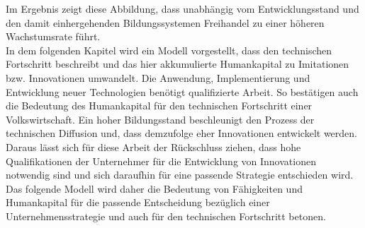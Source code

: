 Im Ergebnis zeigt diese Abbildung, dass unabhängig vom Entwicklungsstand und den damit einhergehenden Bildungssystemen Freihandel zu einer höheren Wachstumsrate führt. \\
In dem folgenden Kapitel wird ein Modell vorgestellt, dass den technischen Fortschritt beschreibt und das hier akkumulierte Humankapital zu Imitationen bzw. Innovationen umwandelt. Die Anwendung, Implementierung und Entwicklung neuer Technologien benötigt qualifizierte Arbeit. So bestätigen auch \citet{Nelson.1966} die Bedeutung des Humankapital für den technischen Fortschritt einer Volkswirtschaft. Ein hoher Bildungsstand beschleunigt den Prozess der technischen Diffusion und, dass demzufolge eher Innovationen entwickelt werden. Daraus l{\"a}sst sich f{\"u}r diese Arbeit der Rückschluss ziehen, dass hohe Qualifikationen der Unternehmer f{\"u}r die Entwicklung von Innovationen notwendig sind und sich daraufhin f{\"u}r eine passende Strategie entschieden wird. Das folgende Modell wird daher die Bedeutung von F{\"a}higkeiten und Humankapital f{\"u}r die passende Entscheidung bezüglich einer Unternehmensstrategie und auch f{\"u}r den technischen Fortschritt betonen.